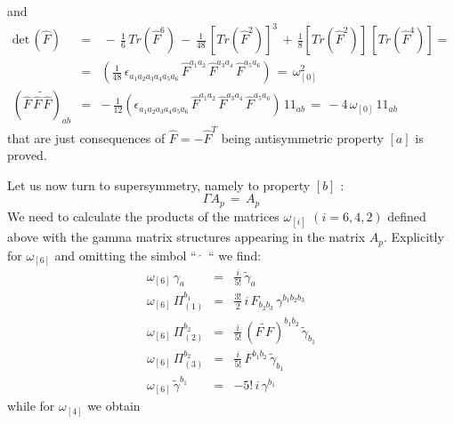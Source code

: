 \documentclass[a4paper,11pt]{article}
\def\tilde{\widetilde}
\begin{document}
and
\begin{eqnarray}
\mbox{det} \, (\hat{F}) \, & = & \, - \, \frac{1}{6} \, Tr(\hat{F}^{6}) \, - \, \frac{1}{48} \, \left[Tr(\hat{F}^{2})\right]^{3} \, + \,
\frac{1}{8} \left[Tr(\hat{F}^{2})\right] \, \left[Tr(\hat{F}^{4})\right] = \\
& = & \left(\frac{1}{48} \, \epsilon_{a_1 a_2 a_3 a_4 a_5 a_6} \, \hat{F}^{a_1 a_2} \,
\hat{F}^{a_3 a_4} \, \hat{F}^{a_5 a_6} \right) \, =  \, \omega_{[0]}^{2} \\
\left(\hat{F} \, \tilde{\hat{F} \, \hat{F}}\right)_{ab}& = & - \,\frac{1}{12}\left( \epsilon_{a_1 a_2 a_3 a_4 a_5 a_6} \, \hat{F}^{a_1 a_2} \, \hat{F}^{a_3 a_4} \, \hat{F}^{a_5 a_6}\right)
\, 1 \! \! 1_{a b} \, = \, - 4 \, \omega_{[0]} \, 1 \! \! 1_{ab}
\label{prop 2 3}
\end{eqnarray}
that are just
consequences of $\widehat{F}=-\widehat{F}^T$ being antisymmetric
property $[a]$ is proved.
\par
Let us now turn to supersymmetry, namely to property $[b]$ :
\begin{equation}
\Gamma A_p \, = \, A_p
\label{torno susy}
\end{equation}
We need to calculate the products of the matrices $\omega_{[i]}$
$(i=6,4,2)$ defined above with the
gamma matrix structures appearing in the matrix $A_p$. Explicitly for
$\omega_{[6]}$ and omitting the simbol `` $ \hat{\phantom{.}} $ `` we find:
\begin{eqnarray}
\omega_{[6]} \, \gamma_{a} & = & \frac{i}{5!} \, {\tilde \gamma_{a}} \nonumber \\
\omega_{[6]} \, \Pi_{(1)}^{b_1} & = & \frac{3!}{2} \, i \, F_{b_2 b_3} \,
\gamma^{b_1 b_2 b_3} \nonumber \\
\omega_{[6]} \, \Pi_{(2)}^{b_2} & = & \frac{i}{5!} \, ({\tilde{F \, F}})^{b_1 b_2}
\, {\tilde \gamma_{b_1}} \nonumber \\
\omega_{[6]} \, \Pi_{(3)}^{b_2} & = & \frac{i}{5!} \, F^{b_1 b_2} \, {\tilde \gamma_{b_1}} \nonumber \\
\omega_{[6]} \, {\tilde \gamma^{b_1}} & = & -5! \, i \, \gamma^{b_1}
\label{susy om6}
\end{eqnarray}
while for $\omega_{[4]}$ we obtain
\end{document}
